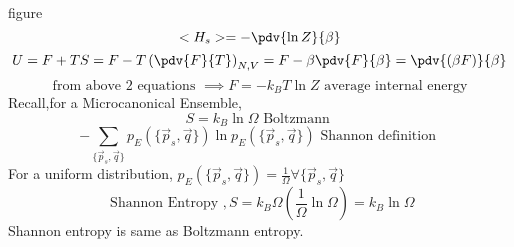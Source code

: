 figure
\[
    <H_s> = - \pdv{\ln Z}{\beta} 
\]
\[
    U = F + TS = F - T \left(\pdv{F}{T}\right)_{N,V} = F - \beta \pdv{F}{\beta}= \pdv{(\beta F)}{\beta}
\]
\[
    \text{ from above 2 equations } \implies \boxed{F = -k_B T \ln Z} \text{ average internal energy }
\]
Recall,for a Microcanonical Ensemble,
\[
    S = k_B \ln  \Omega \text{ Boltzmann }
\]
\[
    -\sum\limits_{\{\vec{p}_s,\vec{q}\}} p_E(\{\vec{p}_s,\vec{q}\}) \ln p_E(\{\vec{p}_s,\vec{q}\}) \text{ Shannon definition }
\]
For a uniform distribution, \(p_E (\{\vec{p}_s,\vec{q}\}) = \frac{1}{\Omega} \forall \{\vec{p}_s,\vec{q}\}\) 
\[
    \text{ Shannon Entropy }, S =  k_B \Omega \left(\frac{1}{\Omega}\ln \Omega\right) = k_B \ln  \Omega
\]
Shannon entropy is same as Boltzmann entropy. 
